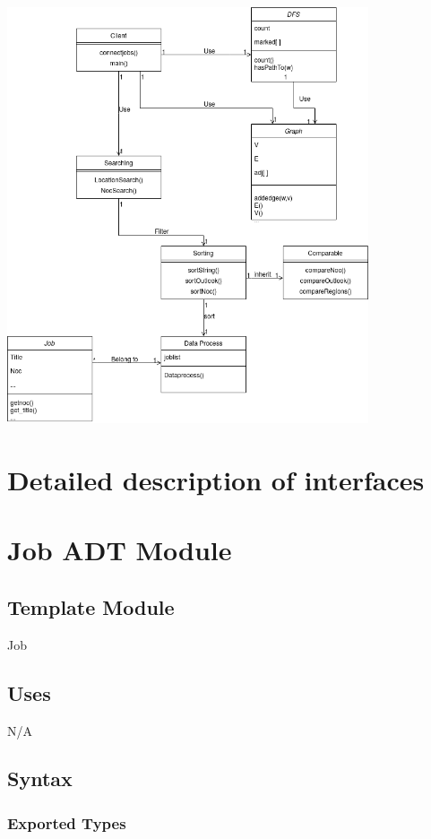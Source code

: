 \documentclass[12pt]{article}
\begin{document}
\begin{center}
\includegraphics[width=0.8\textwidth]{UML Diagram.png}
\end{center}
\newpage
\section{Detailed description of interfaces}
\section* {Job ADT Module}

\subsection*{Template Module}

Job

\subsection* {Uses}

N/A

\subsection* {Syntax}

\subsubsection* {Exported Types}
\end{document}

